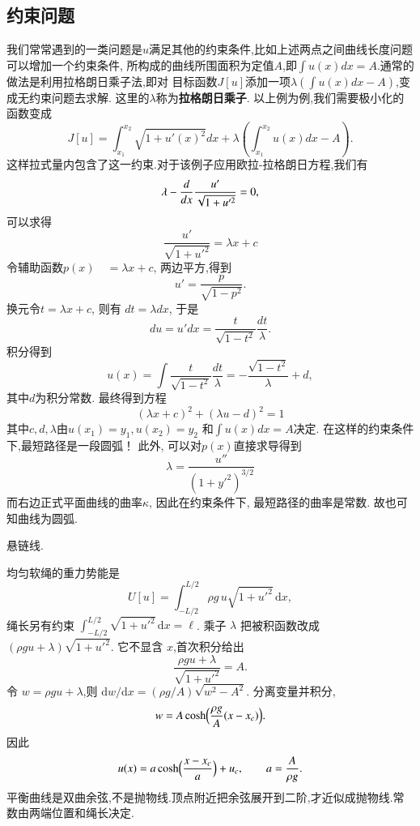 \subsection{约束问题}
我们常常遇到的一类问题是$u$满足其他的约束条件,比如上述两点之间曲线长度问题可以增加一个约束条件,
所构成的曲线所围面积为定值$A$,即$\int u(x) dx = A$.通常的做法是利用拉格朗日乘子法,即对
目标函数$J[u]$添加一项$\lambda\left( \int u(x) dx - A \right)$,变成无约束问题去求解. 
这里的$\lambda$称为\textbf{拉格朗日乘子}.
以上例为例,我们需要极小化的函数变成
$$
J[u] = \int_{x_1}^{x_2} \sqrt{ 1 + u'(x)^2} dx   + \lambda \left( \int_{x_1}^{x_2} u(x) dx - A \right).
$$
这样拉式量内包含了这一约束.对于该例子应用欧拉-拉格朗日方程,我们有
\[
  \lambda - \frac{d{}}{d{x}} \frac{u'}{\sqrt{1 + u'^2}} = 0,
\]
可以求得
\[
 \frac{u'}{\sqrt{1+u'^2}}= \lambda x + c   %
 \]
令辅助函数$ p(x)\quad  = \lambda x + c   $,  两边平方,得到
\[ u' = \frac{p}{\sqrt{1 - p^2}} .
\]
换元令$ t = \lambda x + c$, 则有 $dt = \lambda dx$, 于是
\[
 du = u' dx = \frac{t}{\sqrt{1 - t^2}} \frac{dt}{\lambda} .
\]
积分得到
\[
u(x) = \int \frac{t}{\sqrt{1 - t^2}} \frac{dt}{\lambda} = - \frac{\sqrt{1 - t^2}}{\lambda} + d,
\]
其中$d$为积分常数.
最终得到方程
\[
  (\lambda x +c)^2 + (\lambda u -d)^2 = 1
\]
其中$c,d,\lambda$由$u(x_1)=y_1, u(x_2) = y_2$ 和$\int u(x) dx = A$决定.
在这样的约束条件下,最短路径是一段圆弧！
此外, 可以对$p(x)$直接求导得到
\[
\lambda = \frac{u''}{(1+y'^2) ^{3/2}}
\]
而右边正式平面曲线的曲率$\kappa$, 因此在约束条件下, 最短路径的曲率是常数.
故也可知曲线为圆弧.

\begin{example}
悬链线.
\end{example}
\begin{solution}
均匀软绳的重力势能是
\begin{equation}
  U[u] = \int_{-L/2}^{L/2} \rho g\, u\sqrt{1+u'^2}\,\mathrm{d}x,
\end{equation}
绳长另有约束 $\int_{-L/2}^{L/2}\sqrt{1+u'^2}\,\mathrm{d}x=\ell$.
乘子 $\lambda$ 把被积函数改成 $(\rho g u+\lambda)\sqrt{1+u'^2}$.
它不显含 $x$,首次积分给出
\begin{equation}
  \frac{\rho g u+\lambda}{\sqrt{1+u'^2}} = A .
\end{equation}
令 $w=\rho g u+\lambda$,则 $\mathrm{d}w/\mathrm{d}x = (\rho g/A)\sqrt{w^2-A^2}$.
分离变量并积分,
\begin{equation}
  w = A \cosh\Bigl(\frac{\rho g}{A}(x-x_c)\Bigr).
\end{equation}
因此
\begin{equation}
  u(x) = a\cosh\Bigl(\frac{x-x_c}{a}\Bigr) + u_c,
  \qquad a=\frac{A}{\rho g}.
\end{equation}
平衡曲线是双曲余弦,不是抛物线.顶点附近把余弦展开到二阶,才近似成抛物线.常数由两端位置和绳长决定.
\end{solution}




